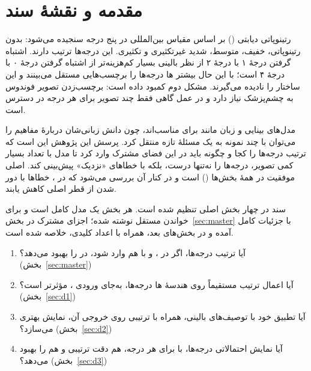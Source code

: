 \section*{مقدمه و نقشهٔ سند}

رتینوپاتی دیابتی () بر اساس مقیاس بین‌المللی  در پنج درجه سنجیده می‌شود: بدون رتینوپاتی، خفیف، متوسط، شدید غیرتکثیری و تکثیری. این درجه‌ها ترتیب دارند. اشتباه گرفتن درجهٔ ۱ با درجهٔ ۲ از نظر بالینی بسیار کم‌هزینه‌تر از اشتباه گرفتن درجهٔ ۰ با درجهٔ ۴ است؛ با این حال بیشتر ها درجه‌ها را برچسب‌هایی مستقل می‌بینند و این ساختار را نادیده می‌گیرند. مشکل دوم کمبود داده است: برچسب‌زدن تصویر فوندوس به چشم‌پزشک نیاز دارد و در عمل گاهی فقط چند تصویر برای هر درجه در دسترس است.

مدل‌های بینایی و زبان مانند  \cite{clip} برای   مناسب‌اند، چون دانش زبانی‌شان دربارهٔ مفاهیم را می‌توان با چند نمونه به یک مسئلهٔ تازه منتقل کرد. پرسش این پژوهش این است که ترتیب درجه‌ها را کجا و چگونه باید در این فضای مشترک وارد کرد تا مدل با تعداد بسیار کمی تصویر، درجه‌ها را نه‌تنها درست، بلکه با خطاهای «نزدیک» پیش‌بینی کند.  اصلی موفقیت در همهٔ بخش‌ها  () است و در کنار آن بررسی می‌شود که در ، خطاها با دور شدن از قطر اصلی کاهش یابند.

سند در چهار بخش اصلی تنظیم شده است. هر بخش یک مدل کامل است و برای خواندن مستقل نوشته شده؛ اجزای مشترک در بخش~\ref{sec:master} با جزئیات کامل آمده و در بخش‌های بعد، همراه با اعداد کلیدی، خلاصه شده است.

\begin{keybox}
\begin{enumerate}[label=\arabic*.]
\item آیا ترتیب درجه‌ها، اگر در ،  و  با هم وارد شود، در    را بهبود می‌دهد؟ (بخش~\ref{sec:master})
\item آیا اعمال ترتیب مستقیماً روی هندسهٔ ها درجه‌ها، به‌جای ورودی ، مؤثرتر است؟ (بخش~\ref{sec:d1})
\item آیا تطبیق خود  با توصیف‌های بالینی، همراه با  ترتیبی روی خروجی آن، نمایش بهتری می‌سازد؟ (بخش~\ref{sec:d2})
\item آیا نمایش احتمالاتی درجه‌ها، با   برای هر درجه، هم دقت ترتیبی و هم  را بهبود می‌دهد؟ (بخش~\ref{sec:d3})
\end{enumerate}
\end{keybox}

